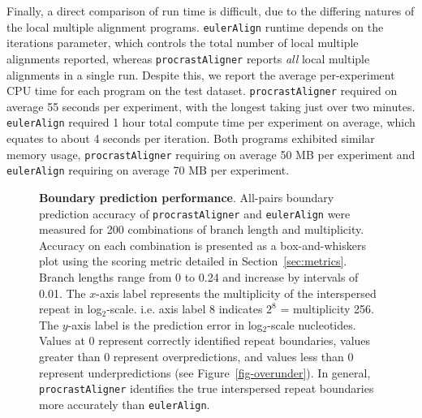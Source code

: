 \documentclass{llncs}
\begin{document}
Finally, a direct comparison of run time is difficult, due to the differing natures of the local multiple alignment programs.  \texttt{eulerAlign} runtime depends on the iterations parameter, which controls the total number of local multiple alignments reported, whereas \texttt{procrastAligner} reports \textit{all} local multiple alignments in a single run.  Despite this, we report the average per-experiment CPU time for each program on the test dataset. \texttt{procrastAligner} required on average 55 seconds per experiment, with the longest taking just over two minutes. \texttt{eulerAlign} required 1 hour total compute time per experiment on average, which equates to about 4 seconds per iteration.  Both programs exhibited similar memory usage, \texttt{procrastAligner} requiring on average 50 MB per experiment and \texttt{eulerAlign} requiring on average 70 MB per experiment.

\begin{figure}[t!]
\centering
{}
\caption{\textbf{Boundary prediction performance}. All-pairs boundary prediction accuracy of \texttt{procrastAligner} and \texttt{eulerAlign} were measured for 200 combinations of branch length and multiplicity.  Accuracy on each combination is presented as a box-and-whiskers plot using the scoring metric detailed in Section~\ref{sec:metrics}.  Branch lengths range from 0 to 0.24 and increase by intervals of 0.01.  The $x$-axis label represents the multiplicity of the interspersed repeat in log$_2$-scale. i.e. axis label 8 indicates $2^{8}$ = multiplicity 256. The $y$-axis label is the prediction error in log$_2$-scale nucleotides. Values at 0 represent correctly identified repeat boundaries, values greater than 0 represent overpredictions, and values less than 0 represent underpredictions (see Figure~\ref{fig-overunder}). In general, \texttt{procrastAligner} identifies the true interspersed repeat boundaries more accurately than \texttt{eulerAlign}.}
\label{fig-boundary}
\end{figure}
\end{document}
